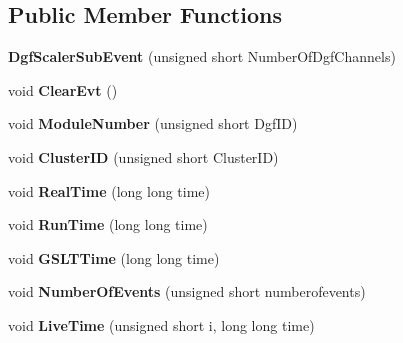 \subsection*{Public Member Functions}
\begin{DoxyCompactItemize}
\item 
\mbox{\label{class_dgf_scaler_sub_event_ac65cb699d5b4871413b3c002f7b73f5a}} 
{\bfseries Dgf\+Scaler\+Sub\+Event} (unsigned short Number\+Of\+Dgf\+Channels)
\item 
\mbox{\label{class_dgf_scaler_sub_event_ad0b0f669bbcc04e4b36bcdc4805f192a}} 
void {\bfseries Clear\+Evt} ()
\item 
\mbox{\label{class_dgf_scaler_sub_event_ac922696259ea41870006d5be47874b37}} 
void {\bfseries Module\+Number} (unsigned short Dgf\+ID)
\item 
\mbox{\label{class_dgf_scaler_sub_event_a0b7123702ce75e4a63c361a8aa6175a1}} 
void {\bfseries Cluster\+ID} (unsigned short Cluster\+ID)
\item 
\mbox{\label{class_dgf_scaler_sub_event_a275332fa9b50f56b22309a49d2ee3079}} 
void {\bfseries Real\+Time} (long long time)
\item 
\mbox{\label{class_dgf_scaler_sub_event_a597eab29b76c324a155680013ffddd8b}} 
void {\bfseries Run\+Time} (long long time)
\item 
\mbox{\label{class_dgf_scaler_sub_event_ac96a965870e1ce824fab2996c2ab84fc}} 
void {\bfseries G\+S\+L\+T\+Time} (long long time)
\item 
\mbox{\label{class_dgf_scaler_sub_event_a62292d645d559bea309ba1016c247429}} 
void {\bfseries Number\+Of\+Events} (unsigned short numberofevents)
\item 
\mbox{\label{class_dgf_scaler_sub_event_ab1b1268e16fc5e7b425fd99becb00c01}} 
void {\bfseries Live\+Time} (unsigned short i, long long time)
\item 
\mbox{\label{class_dgf_scaler_sub_event_ae5d59c7c3ad191088a7d5ba4c92b959f}} 

\end{DoxyCompactItemize}
